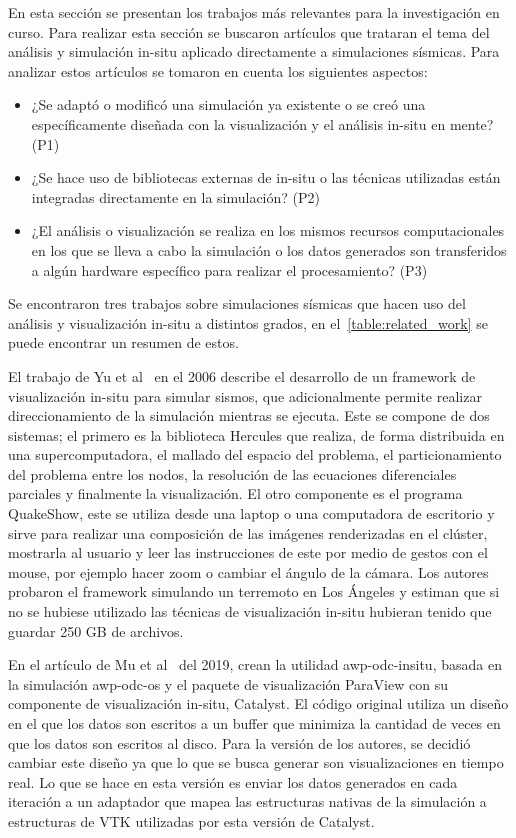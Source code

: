 En esta sección se presentan los trabajos más relevantes para la investigación en curso. Para realizar esta sección se buscaron artículos que trataran el tema del análisis y simulación in-situ aplicado directamente a simulaciones sísmicas. Para analizar estos artículos se tomaron en cuenta los siguientes aspectos:
\begin{itemize}
    \item ¿Se adaptó o modificó una simulación ya existente o se creó una específicamente diseñada con la visualización y el análisis in-situ en mente? (P1)
    \item ¿Se hace uso de bibliotecas externas de in-situ o las técnicas utilizadas están integradas directamente en la simulación? (P2)
    \item ¿El análisis o visualización se realiza en los mismos recursos computacionales en los que se lleva a cabo la simulación o los datos generados son transferidos a algún hardware específico para realizar el procesamiento? (P3)
\end{itemize}

Se encontraron tres trabajos sobre simulaciones sísmicas que hacen uso del análisis y visualización in-situ a distintos grados, en el~\cref{table:related_work} se puede encontrar un resumen de estos.

El trabajo de Yu et al~\cite{Yu2006} en el 2006 describe el desarrollo de un framework de visualización in-situ para simular sismos, que adicionalmente permite realizar direccionamiento de la simulación mientras se ejecuta. Este se compone de dos sistemas; el primero es la biblioteca Hercules que realiza, de forma distribuida en una supercomputadora, el mallado del espacio del problema, el particionamiento del problema entre los nodos, la resolución de las ecuaciones diferenciales parciales y finalmente la visualización. El otro componente es el programa QuakeShow, este se utiliza desde una laptop o una computadora de escritorio y sirve para realizar una composición de las imágenes renderizadas en el clúster, mostrarla al usuario y leer las instrucciones de este por medio de gestos con el mouse, por ejemplo hacer zoom o cambiar el ángulo de la cámara.
Los autores probaron el framework simulando un terremoto en Los Ángeles y estiman que si no se hubiese utilizado las técnicas de visualización in-situ hubieran tenido que guardar 250 GB de archivos.

En el artículo de Mu et al~\cite{mu_-situ_2019} del 2019, crean la utilidad awp-odc-insitu, basada en la simulación awp-odc-os y el paquete de visualización ParaView con su componente de visualización in-situ, Catalyst. El código original utiliza un diseño en el que los datos son escritos a un buffer que minimiza la cantidad de veces en que los datos son escritos al disco. Para la versión de los autores, se decidió cambiar este diseño ya que lo que se busca generar son visualizaciones en tiempo real. Lo que se hace en esta versión es enviar los datos generados en cada iteración a un adaptador que mapea las estructuras nativas de la simulación a estructuras de VTK utilizadas por esta versión de Catalyst.

